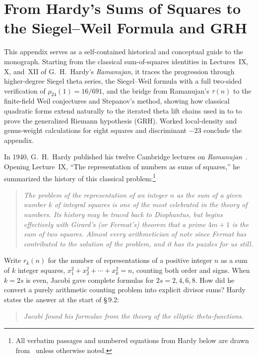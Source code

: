 \chapter{From Hardy's Sums of Squares to the Siegel--Weil Formula and GRH}
\label{app:hardy-theta-intro}

\begin{chapterguide}
This appendix serves as a self-contained historical and conceptual guide to the monograph. Starting from the classical sum-of-squares identities in Lectures~IX, X, and~XII of G.~H.~Hardy's \emph{Ramanujan}, it traces the progression through higher-degree Siegel theta series, the Siegel--Weil formula with a full two-sided verification of $\rho_{24}(1)=16/691$, and the bridge from Ramanujan's $\tau(n)$ to the finite-field Weil conjectures and Stepanov's method, showing how classical quadratic forms extend naturally to the iterated theta lift chains used in  to  to prove the generalized Riemann hypothesis (GRH). Worked local-density and genus-weight calculations for eight squares and discriminant $-23$ conclude the appendix.
\end{chapterguide}

In 1940, G.~H.~Hardy published his twelve Cambridge lectures on \emph{Ramanujan}~\cite{Hardy1940}. Opening Lecture~IX, ``The representation of numbers as sums of squares,'' he summarized the history of this classical problem:\footnote{All verbatim passages and numbered equations from Hardy below are drawn from~\cite[Lecture~IX, \S\S\,9.1--9.17, pp.~132--155]{Hardy1940} unless otherwise noted.}
\begin{quote}
\itshape
The problem of the representation of an integer $n$ as the sum of a given number $k$ of integral squares is one of the most celebrated in the theory of numbers. Its history may be traced back to Diophantus, but begins effectively with Girard's (or Fermat's) theorem that a prime $4m+1$ is the sum of two squares. Almost every arithmetician of note since Fermat has contributed to the solution of the problem, and it has its puzzles for us still.
\end{quote}

Write $r_k(n)$ for the number of representations of a positive integer $n$ as a sum of $k$ integer squares, $x_1^2+x_2^2+\cdots+x_k^2=n$, counting both order and signs. When $k=2s$ is even, Jacobi gave complete formulas for $2s=2,4,6,8$. How did he convert a purely arithmetic counting problem into explicit divisor sums? Hardy states the answer at the start of \S\,9.2:
\begin{quote}
\itshape
Jacobi found his formulae from the theory of the elliptic theta-functions.
\end{quote}

